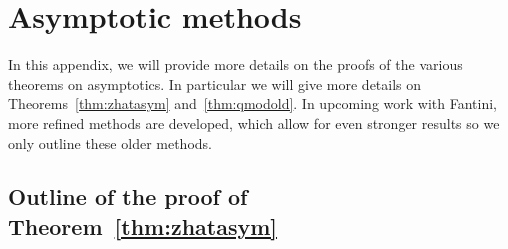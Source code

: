 \documentclass[pdftex]{sigma}
\numberwithin{equation}{section}
\begin{document}
\section{Asymptotic methods}\label{sec:asymp.meth.ap}

In this appendix, we will provide more details on the proofs of the various theorems on asymptotics. In particular we will give more details on Theorems~\ref{thm:zhatasym} and~\ref{thm:qmodold}. In upcoming work with Fantini, more refined methods are developed, which allow for even stronger results so we only outline these older methods.

\subsection{Outline of the proof of Theorem~\ref{thm:zhatasym}}
\end{document}
